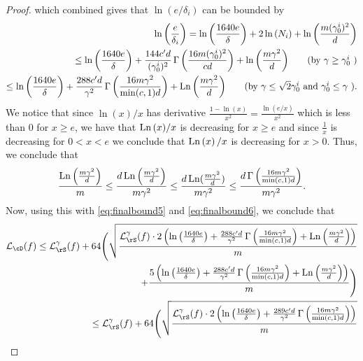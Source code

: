 \begin{proof}
      which combined gives that $ \ln{\left(e/\delta_{i} \right)} $  can be bounded by 
      \begin{align}\label{eq:finalbound6}
       \ln{\left(\frac{e}{\delta_{i}} \right)}= \ln{\left(\frac{1640e}{\delta} \right)}+2\ln{\left( N_{i}\right)}+\ln{\left(\frac{m(\gamma_{0}^{i})^{2}}{d} \right)}
       \\
       \leq \ln{\left(\frac{1640e}{\delta} \right)}+\frac{144c'd}{ (\gamma_{0}^{i})^{2}} \func{\left(  \frac{16 m(\gamma_{0}^{i})^{2}}{cd} \right)} +\ln{\left(\frac{m\gamma^{2}}{d} \right)} \tag{by $ \gamma\geq \gamma_{0}^{i} $  }
        \\
        \leq \ln{\left(\frac{1640e}{\delta} \right)}+\frac{288c'd}{ \gamma^{2}} \func{\left(  \frac{16 m\gamma^{2} }{\min(c,1)d} \right)} +\Ln{\left(\frac{m\gamma^{2} }{d} \right)} \tag{by $ \gamma \leq \sqrt{2}\gamma_{0}^{i}$ and $ \gamma_{0}^{i}\leq \gamma $ }.
      \end{align}
      We notice that since $ \ln{\left(x \right)}/x $ has derivative $ \frac{1-\ln{\left(x \right)}}{x^2}=\frac{\ln{\left(e/x \right)}}{x^{2}} $ which is less than $ 0 $  for $ x\geq e $, we have that $\operatorname{\mathrm{Ln}}{\left(x \right)}/x   $ is decreasing for $ x\geq e $ and since $ \frac{1}{x} $ is decreasing for $ 0<x<e $ we conclude that $ \operatorname{\mathrm{Ln}}\left(x\right)/x $ is decreasing for $ x>0$. Thus, we conclude that
      \begin{align*}
        \frac{\operatorname{\mathrm{Ln}}{\left(\frac{m\gamma^{2}}{d} \right)}}{m}  \leq  \frac{d\operatorname{\mathrm{Ln}}{\left(\frac{m\gamma^{2}}{d} \right)}}{m\gamma^{2}}\leq \frac{d\operatorname{\mathrm{Ln}}(\frac{m\gamma^{2} }{d})}{m\gamma^{2}}\leq \frac{d\operatorname{\Gamma}{\left(  \frac{16 m\gamma^{2} }{\min(c,1)d} \right)} }{m\gamma^{2}}.
      \end{align*}  
      Now, using this with \cref{eq:finalbound5} and \cref{eq:finalbound6}, we conclude that 
      \begin{align*}
        \ls_{\cD}(f) 
        \leq \ls_{\rS}^{\gamma}(f)
        + \cc\Bigg(\sqrt{\frac{\ls_{\rS}^{\gamma}(f)\cdot 2 \left(\ln{\left(\frac{1640e}{\delta} \right)}+\frac{288c'd}{ \gamma^{2}} \func{\left(  \frac{16 m\gamma^{2} }{\min(c,1)d} \right)} +\Ln{\left(\frac{m\gamma^{2}}{d} \right)} \right)}{m}}
        \\
        +\frac{5\left( \ln{\left(\frac{1640e}{\delta} \right)}+\frac{288c'd}{ \gamma^{2}} \func{\left(  \frac{16 m\gamma^{2} }{\min(c,1)d} \right)} +\Ln{\left(\frac{m\gamma^{2}}{d} \right)}\right)}{m}\Bigg)
        \\
        \leq
        \ls_{\rS}^{\gamma}(f)
        + \cc\Bigg(\sqrt{\frac{\ls_{\rS}^{\gamma}(f)\cdot 2 \left(\ln{\left(\frac{1640e}{\delta} \right)}+\frac{289c'd}{ \gamma^{2}} \func{\left(  \frac{16 m\gamma^{2} }{\min(c,1)d} \right)} \right)}{m}}

\end{align*}
\end{proof}
